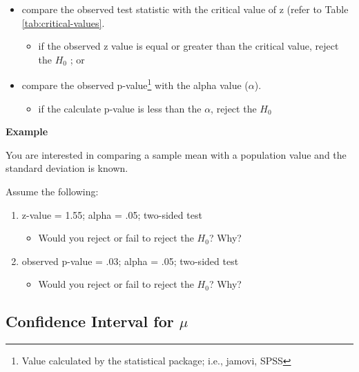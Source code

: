 \documentclass[
]{article}
\providecommand{\tightlist}{%
  \setlength{\itemsep}{0pt}\setlength{\parskip}{0pt}}
\begin{document}
\begin{itemize}
\item
  compare the observed test statistic with the critical value of z (refer to Table \ref{tab:critical-values}.

  \begin{itemize}
  \tightlist
  \item
    if the observed z value is equal or greater than the critical value, reject the \(H_0\) ; or
  \end{itemize}
\item
  compare the observed p-value\footnote{Value calculated by the statistical package; i.e., jamovi, SPSS} with the alpha value (\(\alpha\)).

  \begin{itemize}
  \tightlist
  \item
    if the calculate p-value is less than the \(\alpha\), reject the \(H_0\)
  \end{itemize}
\end{itemize}

\textbf{Example}

You are interested in comparing a sample mean with a population value and the standard deviation is known.

Assume the following:

\begin{enumerate}
\def\labelenumi{\arabic{enumi}.}
\item
  z-value = 1.55; alpha = .05; two-sided test

  \begin{itemize}
  \tightlist
  \item
    Would you reject or fail to reject the \(H_0\)? Why?
  \end{itemize}
\item
  observed p-value = .03; alpha = .05; two-sided test

  \begin{itemize}
  \tightlist
  \item
    Would you reject or fail to reject the \(H_0\)? Why?
  \end{itemize}
\end{enumerate}

\hypertarget{confidence-interval-for-mu-1}{%
\subsection{\texorpdfstring{Confidence Interval for \(\mu\)}{Confidence Interval for \textbackslash mu}}\label{confidence-interval-for-mu-1}}
\end{document}
